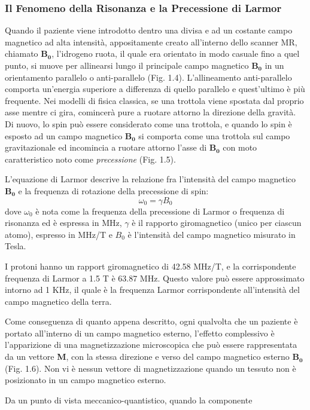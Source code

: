 \documentclass[leqno,10pt,twocolumn,a4paper]{article}
\begin{document}
	\subsubsection{Il Fenomeno della Risonanza e la Precessione di Larmor}
	Quando il paziente viene introdotto dentro una divisa e ad un costante campo magnetico ad alta intensità, appositamente creato all'interno dello scanner MR, chiamato $\boldsymbol{B_0}$, l'idrogeno ruota, il quale era
	orientato in modo casuale fino a quel punto, si muove per allinearsi lungo il principale campo magnetico $\boldsymbol{B_0}$ in un orientamento parallelo o anti-parallelo (Fig. 1.4). L'allineamento anti-parallelo comporta 
	un'energia superiore a differenza di quello parallelo e quest'ultimo è più frequente. Nei modelli di fisica classica, se una trottola viene spostata dal proprio asse mentre ci gira, comincerà pure a ruotare attorno la direzione della gravità. 
	Di nuovo, lo spin può essere considerato come una trottola, e quando lo spin è esposto ad un campo magnetico $\boldsymbol{B_0}$ si comporta come una trottola sul campo gravitazionale ed incomincia a ruotare attorno
	l'asse di $\boldsymbol{B_0}$ con moto caratteristico noto come \textit{precessione} (Fig. 1.5). \par L'equazione di Larmor descrive la relazione fra l'intensità del campo magnetico $\boldsymbol{B_0}$ e la frequenza di 
	rotazione della precessione di spin:
	\begin{equation}
		\omega_0=\gamma B_0
	\end{equation}
	dove $\omega_0$ è nota come la frequenza della precessione di Larmor o frequenza di risonanza ed è espressa in MHz, $\gamma$ è il rapporto giromagnetico (unico per ciascun atomo), espresso in MHz/T e $B_0$ è 
	l'intensità del campo magnetico misurato in Tesla. \par I protoni hanno un rapport giromagnetico di 42.58 MHz/T, e la corrispondente frequenza di Larmor a 1.5 T è 63.87 MHz. Questo valore può essere approssimato
	intorno ad 1 KHz, il quale è la frequenza Larmor corrispondente all'intensità del campo magnetico della terra. \par Come conseguenza di quanto appena descritto, ogni qualvolta che un paziente è portato all'interno di un
	campo magnetico esterno, l'effetto complessivo è l'apparizione di una magnetizzazione microscopica che può essere rappresentata da un vettore \textbf{M}, con la stessa direzione e verso del campo magnetico esterno
	$\boldsymbol{B_0}$ (Fig. 1.6). Non vi è nessun vettore di magnetizzazione quando un tessuto non è posizionato in un campo magnetico esterno. \par Da un punto di vista meccanico-quantistico, quando la componente 
\end{document}
